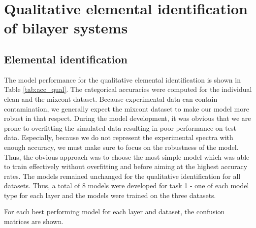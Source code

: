 \section{Qualitative elemental identification of bilayer systems}
\subsection{Elemental identification}
The model performance for the qualitative elemental identification is shown in Table \ref{tab:acc_qual}. The categorical accuracies were computed for the individual clean and the mixcont dataset. Because experimental data can contain contamination, we generally expect the mixcont dataset to make our model more robust in that respect.
During the model development, it was obvious that we are prone to overfitting the simulated data resulting in poor performance on test data. Especially, because we do not represent the experimental spectra with enough accuracy, we must make sure to focus on the robustness of the model. Thus, the obvious approach was to choose the most simple model which was able to train effectively without overfitting and before aiming at the highest accuracy rates. The models remained unchanged for the qualitative identification for all datasets. Thus, a total of 8 models were developed for task 1 - one of each model type for each layer and the models were trained on the three datasets.

For each best performing model for each layer and dataset, the confusion matrices are shown.

